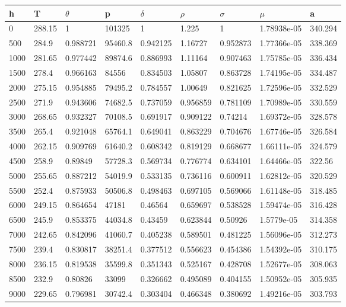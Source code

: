 \begin{tabular}{lllllllll}
h & T & $\theta$ & p & $\delta$ & $\rho$ & $\sigma$ & $\mu$ & a \\
\hline
0 & 288.15 & 1 & 101325 & 1 & 1.225 & 1 & 1.78938e-05 & 340.294 \\
500 & 284.9 & 0.988721 & 95460.8 & 0.942125 & 1.16727 & 0.952873 & 1.77366e-05 & 338.369 \\
1000 & 281.65 & 0.977442 & 89874.6 & 0.886993 & 1.11164 & 0.907463 & 1.75785e-05 & 336.434 \\
1500 & 278.4 & 0.966163 & 84556 & 0.834503 & 1.05807 & 0.863728 & 1.74195e-05 & 334.487 \\
2000 & 275.15 & 0.954885 & 79495.2 & 0.784557 & 1.00649 & 0.821625 & 1.72596e-05 & 332.529 \\
2500 & 271.9 & 0.943606 & 74682.5 & 0.737059 & 0.956859 & 0.781109 & 1.70989e-05 & 330.559 \\
3000 & 268.65 & 0.932327 & 70108.5 & 0.691917 & 0.909122 & 0.74214 & 1.69372e-05 & 328.578 \\
3500 & 265.4 & 0.921048 & 65764.1 & 0.649041 & 0.863229 & 0.704676 & 1.67746e-05 & 326.584 \\
4000 & 262.15 & 0.909769 & 61640.2 & 0.608342 & 0.819129 & 0.668677 & 1.66111e-05 & 324.579 \\
4500 & 258.9 & 0.89849 & 57728.3 & 0.569734 & 0.776774 & 0.634101 & 1.64466e-05 & 322.56 \\
5000 & 255.65 & 0.887212 & 54019.9 & 0.533135 & 0.736116 & 0.600911 & 1.62812e-05 & 320.529 \\
5500 & 252.4 & 0.875933 & 50506.8 & 0.498463 & 0.697105 & 0.569066 & 1.61148e-05 & 318.485 \\
6000 & 249.15 & 0.864654 & 47181 & 0.46564 & 0.659697 & 0.538528 & 1.59474e-05 & 316.428 \\
6500 & 245.9 & 0.853375 & 44034.8 & 0.43459 & 0.623844 & 0.50926 & 1.5779e-05 & 314.358 \\
7000 & 242.65 & 0.842096 & 41060.7 & 0.405238 & 0.589501 & 0.481225 & 1.56096e-05 & 312.273 \\
7500 & 239.4 & 0.830817 & 38251.4 & 0.377512 & 0.556623 & 0.454386 & 1.54392e-05 & 310.175 \\
8000 & 236.15 & 0.819538 & 35599.8 & 0.351343 & 0.525167 & 0.428708 & 1.52677e-05 & 308.063 \\
8500 & 232.9 & 0.80826 & 33099 & 0.326662 & 0.495089 & 0.404155 & 1.50952e-05 & 305.935 \\
9000 & 229.65 & 0.796981 & 30742.4 & 0.303404 & 0.466348 & 0.380692 & 1.49216e-05 & 303.793 \\

\end{tabular}
